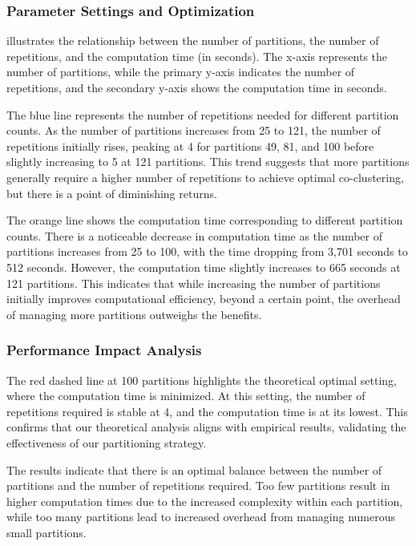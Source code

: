 \documentclass[journal]{IEEEtran}
\begin{document}
\subsubsection{Parameter Settings and Optimization}
 illustrates the relationship between the number of partitions, the number of repetitions, and the computation time (in seconds). The x-axis represents the number of partitions, while the primary y-axis indicates the number of repetitions, and the secondary y-axis shows the computation time in seconds.

The blue line represents the number of repetitions needed for different partition counts. As the number of partitions increases from 25 to 121, the number of repetitions initially rises, peaking at 4 for partitions 49, 81, and 100 before slightly increasing to 5 at 121 partitions. This trend suggests that more partitions generally require a higher number of repetitions to achieve optimal co-clustering, but there is a point of diminishing returns.

The orange line shows the computation time corresponding to different partition counts. There is a noticeable decrease in computation time as the number of partitions increases from 25 to 100, with the time dropping from 3,701 seconds to 512 seconds. However, the computation time slightly increases to 665 seconds at 121 partitions. This indicates that while increasing the number of partitions initially improves computational efficiency, beyond a certain point, the overhead of managing more partitions outweighs the benefits.

\subsubsection{Performance Impact Analysis}
The red dashed line at 100 partitions highlights the theoretical optimal setting, where the computation time is minimized. At this setting, the number of repetitions required is stable at 4, and the computation time is at its lowest. This confirms that our theoretical analysis aligns with empirical results, validating the effectiveness of our partitioning strategy.

The results indicate that there is an optimal balance between the number of partitions and the number of repetitions required. Too few partitions result in higher computation times due to the increased complexity within each partition, while too many partitions lead to increased overhead from managing numerous small partitions.
\end{document}
